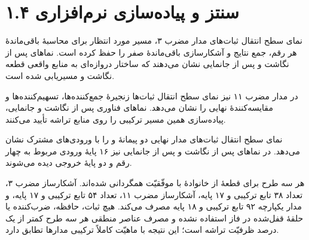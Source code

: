 \documentclass[12pt,a4paper]{article}
\begin{document}

	\section*{۱.۴ سنتز و پیاده‌سازی نرم‌افزاری}
	نمای سطح انتقال ثبات‌های مدار مضرب ۳، مسیر مورد انتظار برای محاسبهٔ باقی‌ماندهٔ هر رقم، جمع نتایج و آشکارسازی باقی‌ماندهٔ صفر را حفظ کرده است. نماهای پس از نگاشت و پس از جانمایی نشان می‌دهند که ساختار دروازه‌ای به منابع واقعی قطعه نگاشت و مسیریابی شده است.


	در مدار مضرب ۱۱ نیز نمای سطح انتقال ثبات‌ها زنجیرهٔ جمع‌کننده‌ها، تسهیم‌کننده‌ها و مقایسه‌کنندهٔ نهایی را نشان می‌دهد. نماهای فناوری پس از نگاشت و جانمایی، پیاده‌سازی همین مسیر ترکیبی را روی منابع تراشه تأیید می‌کنند.


	نمای سطح انتقال ثبات‌های مدار نهایی دو پیمانهٔ  و  را با ورودی‌های مشترک نشان می‌دهد. در نماهای پس از نگاشت و پس از جانمایی نیز ۱۶ پایهٔ ورودی مربوط به چهار رقم و دو پایهٔ خروجی دیده می‌شوند.


	هر سه طرح برای قطعهٔ  از خانوادهٔ  با موفّقیّت همگردانی شده‌اند. آشکارساز مضرب ۳، تعداد ۳۸ تابع ترکیبی و ۱۷ پایه، آشکارساز مضرب ۱۱، تعداد ۵۴ تابع ترکیبی و ۱۷ پایه، و مدار یکپارچه ۹۲ تابع ترکیبی و ۱۸ پایه مصرف می‌کند. هیچ ثبات، حافظه، ضرب‌کننده یا حلقهٔ قفل‌شده در فاز استفاده نشده و مصرف عناصر منطقی هر سه طرح کمتر از یک درصد ظرفیّت تراشه است؛ این نتیجه با ماهیّت کاملاً ترکیبی مدارها تطابق دارد.
\end{document}
